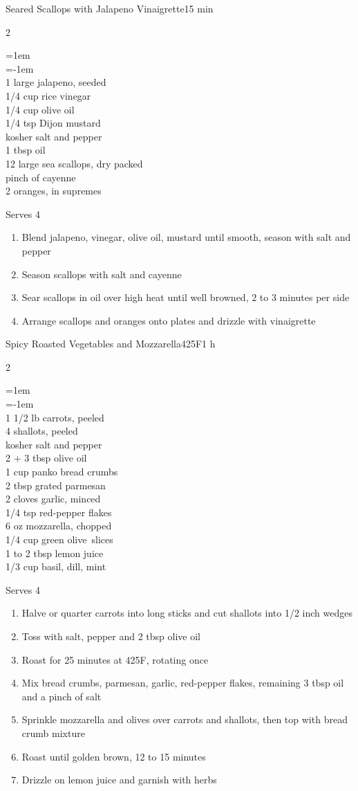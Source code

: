 \documentclass{article}
\newenvironment{recipe}[3][]
    {\begin{cardbase}[#1]{#2}{#3}
    \columnratio{0.333}
    \begin{paracol}{2}}
    {\end{paracol}\end{cardbase}}
\newenvironment{denserecipe}[3][]
    {\small
    \begin{recipe}[#1]{#2}{#3}}
    {\end{recipe}}
\newcommand{\nextcolumn}{\switchcolumn}
\newenvironment{ingredients}
    {
    \begin{obeylines}
    \vspace{\parskip}
    \setlength{\parskip}{0.25em}
    \vspace{-0.25em}
    \leftskip=1em
    \parindent=-1em}
    {\end{obeylines}}
\newenvironment{steps}
    {\begin{enumerate}[leftmargin=*,topsep=0pt]}
    {\end{enumerate}}
\newcommand{\fahrenheit}[1]{#1\textdegree{}F}
\newcommand{\tag}[1]{\hspace{1em}#1}
\newcommand{\symboltag}[2]{\tag{#1\hspace{0.4em}#2}}
\newcommand{\totaltime}[1]{\symboltag{\raisebox{-0.1em}{\small\StopWatchEnd}}{#1}}
\newcommand{\preheat}[1]{\symboltag{\Topbottomheat}{#1}}
\begin{document}
\begin{recipe}{Seared Scallops with Jalapeno Vinaigrette}{\totaltime{15 min}}
\begin{ingredients}
1 large jalapeno, seeded
1/4 cup rice vinegar
1/4 cup olive oil
1/4 tsp Dijon mustard
kosher salt and pepper
1 tbsp oil
12 large sea scallops, dry packed
pinch of cayenne
2 oranges, in supremes
\end{ingredients}
\nextcolumn
Serves 4
\begin{steps}
\item Blend jalapeno, vinegar, olive oil, mustard until smooth, season with salt and pepper
\item Season scallops with salt and cayenne
\item Sear scallops in oil over high heat until well browned, 2 to 3 minutes per side
\item Arrange scallops and oranges onto plates and drizzle with vinaigrette
\end{steps}
\end{recipe}

\begin{denserecipe}{Spicy Roasted Vegetables and Mozzarella}{\preheat{\fahrenheit{425}}\totaltime{1 h}}
\begin{ingredients}
1 1/2 lb carrots, peeled
4 shallots, peeled
kosher salt and pepper
2 + 3 tbsp olive oil
1 cup panko bread crumbs
2 tbsp grated parmesan
2 cloves garlic, minced
1/4 tsp red-pepper flakes
6 oz mozzarella, chopped
1/4 cup green \mbox{olive slices}
1 to 2 tbsp lemon juice
1/3 cup basil, dill, mint
\end{ingredients}
\nextcolumn
Serves 4
\begin{steps}
\item Halve or quarter carrots into long sticks and cut shallots into 1/2 inch wedges
\item Toss with salt, pepper and 2 tbsp olive oil
\item Roast for 25 minutes at \fahrenheit{425}, rotating once
\item Mix bread crumbs, parmesan, garlic, red-pepper flakes, remaining 3 tbsp oil and a pinch of salt
\item Sprinkle mozzarella and olives over carrots and shallots, then top with bread crumb mixture
\item Roast until golden brown, 12 to 15 minutes
\item Drizzle on lemon juice and garnish with herbs
\end{steps}
\end{denserecipe}
\end{document}
